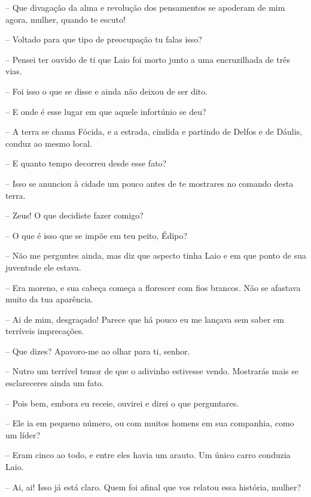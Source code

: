  --   Que divagação da alma e revolução dos pensamentos se apoderam de mim
agora, mulher, quando te escuto!

 --   Voltado para que tipo de preocupação tu falas isso?

 --    Pensei ter ouvido de ti que Laio foi morto junto a uma
encruzilhada de três vias.

 --   Foi isso o que se disse e ainda não deixou de ser dito.

 --   E onde é esse lugar em que aquele infortúnio se deu?

 --   A terra se chama Fócida, e a estrada, cindida e partindo de Delfos e de
Dáulis, conduz ao mesmo local.

 --   E quanto tempo decorreu desde esse fato?

 --   Isso se anunciou à cidade um pouco antes de te mostrares no comando
desta terra.

 --   Zeus! O que decidiste fazer comigo?

 --   O que é isso que se impõe em teu peito, Édipo?

 --    Não me perguntes ainda, mas diz que aspecto tinha Laio e em que
ponto de sua juventude ele estava.

 --   Era moreno, e sua cabeça começa a florescer com fios brancos. Não se
afastava muito da tua aparência.

 --   Ai de mim, desgraçado! Parece que há pouco eu me lançava sem saber em
terríveis imprecações.

 --   Que dizes? Apavoro-me ao olhar para ti, senhor.

 --   Nutro um terrível temor de que o adivinho estivesse vendo. Mostrarás
mais se esclareceres ainda um fato.

 --   Pois bem, embora eu receie, ouvirei e direi o que perguntares.

 --    Ele ia em pequeno número, ou com muitos homens em sua companhia,
como um líder?

 --   Eram cinco ao todo, e entre eles havia um arauto. Um único carro
conduzia Laio.

 --   Ai, ai! Isso já está claro. Quem foi afinal que vos relatou essa
história, mulher?

